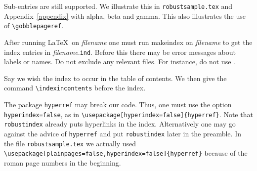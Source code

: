 \documentclass{book}
\begin{document}
Sub-entries are still supported. We illustrate this in
\verb|robustsample.tex| and Appendix~\ref{appendix} with alpha, beta and gamma.
This also illustrates the use of \verb|\gobblepageref|.%
%

After running \LaTeX\ on \textit{filename} 
one must run makeindex on \textit{filename} to get the index entries in \textit{filename}.\texttt{ind}.
Before this there may be error messages about labels or names.
Do not exclude any relevant files. 
For instance, do not use \verb||.

Say we wish the index to occur in the table of contents.
We then give the command \verb|\indexincontents| before the index.

The package \verb|hyperref| may break our code. 
Thus, one must use the option
\verb|hyperindex=false|, as in
\verb|\usepackage[hyperindex=false]{hyperref}|.
Note that \verb|robustindex| already puts
hyperlinks in the index. Alternatively one may go against the advice of
\verb|hyperref| and put \verb|robustindex| later in the preamble.
In the file \verb|robustsample.tex| we actually used
\verb|\usepackage[plainpages=false,hyperindex=false]{hyperref}|
because of the roman page numbers in the beginning.

%
%
%
%
%
%
%
%
%
%
\end{document}
